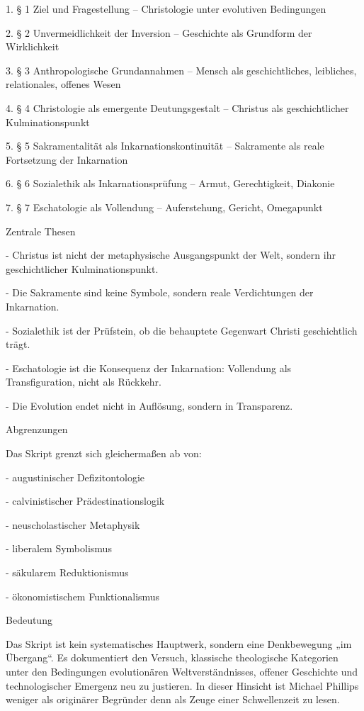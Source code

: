 \documentclass[
  ngerman,
]{article}
\begin{document}
1. § 1 Ziel und Fragestellung -- Christologie unter evolutiven
Bedingungen

2. § 2 Unvermeidlichkeit der Inversion -- Geschichte als Grundform der
Wirklichkeit

3. § 3 Anthropologische Grundannahmen -- Mensch als geschichtliches,
leibliches, relationales, offenes Wesen

4. § 4 Christologie als emergente Deutungsgestalt -- Christus als
geschichtlicher Kulminationspunkt

5. § 5 Sakramentalität als Inkarnationskontinuität -- Sakramente als
reale Fortsetzung der Inkarnation

6. § 6 Sozialethik als Inkarnationsprüfung -- Armut, Gerechtigkeit,
Diakonie

7. § 7 Eschatologie als Vollendung -- Auferstehung, Gericht, Omegapunkt

Zentrale Thesen

- Christus ist nicht der metaphysische Ausgangspunkt der Welt, sondern
ihr geschichtlicher Kulminationspunkt.

- Die Sakramente sind keine Symbole, sondern reale Verdichtungen der
Inkarnation.

- Sozialethik ist der Prüfstein, ob die behauptete Gegenwart Christi
geschichtlich trägt.

- Eschatologie ist die Konsequenz der Inkarnation: Vollendung als
Transfiguration, nicht als Rückkehr.

- Die Evolution endet nicht in Auflösung, sondern in Transparenz.

Abgrenzungen

Das Skript grenzt sich gleichermaßen ab von:

- augustinischer Defizitontologie

- calvinistischer Prädestinationslogik

- neuscholastischer Metaphysik

- liberalem Symbolismus

- säkularem Reduktionismus

- ökonomistischem Funktionalismus

Bedeutung

Das Skript ist kein systematisches Hauptwerk, sondern eine Denkbewegung
„im Übergang``. Es dokumentiert den Versuch, klassische theologische
Kategorien unter den Bedingungen evolutionären Weltverständnisses,
offener Geschichte und technologischer Emergenz neu zu justieren. In
dieser Hinsicht ist Michael Phillips weniger als originärer Begründer
denn als Zeuge einer Schwellenzeit zu lesen.
\end{document}
